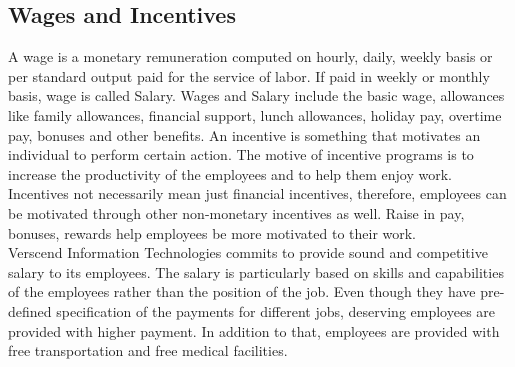\subsection{Wages and Incentives}
A wage is a monetary remuneration computed on hourly, daily, weekly basis or per standard output paid for
the service of labor. If paid in weekly or monthly basis, wage is called Salary. Wages and Salary include the
basic wage, allowances like family allowances, financial support, lunch allowances, holiday pay, overtime
pay, bonuses and other benefits.
An incentive is something that motivates an individual to perform certain action. The motive of incentive
programs is to increase the productivity of the employees and to help them enjoy work. Incentives not
necessarily mean just financial incentives, therefore, employees can be motivated through other non-monetary
incentives as well. Raise in pay, bonuses, rewards help employees be more motivated to their work.
\\ Verscend Information Technologies commits to provide sound and competitive salary to its employees. The salary is
particularly based on skills and capabilities of the employees rather than the position of the job. Even though
they have pre-defined specification of the payments for different jobs, deserving employees are provided with
higher payment.
 In addition to that, employees are
provided with free transportation and free medical facilities.
\cleardoublepage

